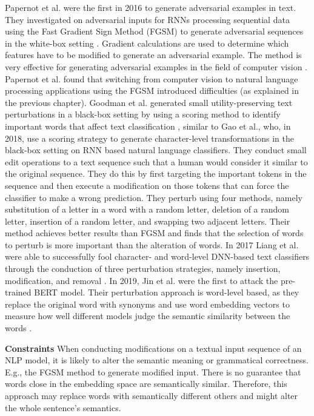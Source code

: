     Papernot et al. were the first in 2016 to generate adversarial examples in text. They investigated on adversarial inputs for RNNs processing sequential data using the Fast Gradient Sign Method (FGSM) to generate adversarial sequences in the white-box setting \cite{papernot2016crafting}. 
    Gradient calculations are used to determine which features have to be modified to generate an adversarial example. The method is very effective for generating adversarial examples in the field of computer vision \cite{goodfellow2014explaining}.
    Papernot et al. found that switching from computer vision to natural language processing applications using the FGSM introduced difficulties (as explained in the previous chapter). 
    Goodman et al. generated small utility-preserving text perturbations in a black-box setting by using a scoring method to identify important words that affect text classification \cite{goodman2020fastwordbug}, similar to Gao et al., who, in 2018, use a scoring strategy to generate character-level transformations in the black-box setting on RNN based natural language classifiers. They conduct small edit operations to a text sequence such that a human would consider it similar to the original sequence. They do this by first targeting the important tokens in the sequence and then execute a modification on those tokens that can force the classifier to make a wrong prediction. They perturb using four methods, namely substitution of a letter in a word with a random letter, deletion of a random letter, insertion of a random letter, and swapping two adjacent letters. Their method achieves better results than FGSM  and finds that the selection of words to perturb is more important than the alteration of words\cite{gao2018black}.  In 2017 Liang et al. were able to successfully fool character- and word-level DNN-based text classifiers through the conduction of three perturbation strategies, namely insertion, modification, and removal \cite{liang2017deep}. In 2019, Jin et al. were the first to attack the pre-trained BERT model. Their perturbation approach is word-level based, as they replace the original word with synonyms and use word embedding vectors to measure how well different models judge the semantic similarity between the words \cite{jin2019bert}.
    
    
\textbf{Constraints}
\label{sec:constraints}
    When conducting modifications on a textual input sequence of an NLP model, it is likely to alter the semantic meaning or grammatical correctness. E.g.,  the FGSM method to generate modified input. There is no guarantee that words close in the embedding space are semantically similar. Therefore, this approach may replace words with semantically different others and might alter the whole sentence's semantics.
    
